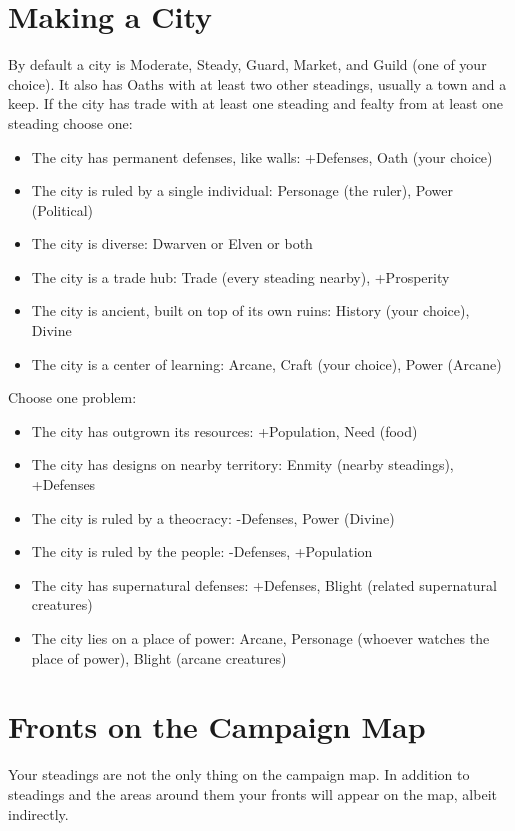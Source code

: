\section*{Making a City}


By default a city is Moderate, Steady, Guard, Market, and Guild (one of your choice). It also has Oaths with at least two other steadings, usually a town and a keep. If the city has trade with at least one steading and fealty from at least one steading choose one:
\begin{itemize}
\item The city has permanent defenses, like walls: +Defenses, Oath (your choice)
\item The city is ruled by a single individual: Personage (the ruler), Power (Political)
\item The city is diverse: Dwarven or Elven or both
\item The city is a trade hub: Trade (every steading nearby), +Prosperity
\item The city is ancient, built on top of its own ruins: History (your choice), Divine
\item The city is a center of learning: Arcane, Craft (your choice), Power (Arcane)

\end{itemize}


Choose one problem:
\begin{itemize}
\item The city has outgrown its resources: +Population, Need (food)
\item The city has designs on nearby territory: Enmity (nearby steadings), +Defenses
\item The city is ruled by a theocracy: -Defenses, Power (Divine)
\item The city is ruled by the people: -Defenses, +Population
\item The city has supernatural defenses: +Defenses, Blight (related supernatural creatures)
\item The city lies on a place of power: Arcane, Personage (whoever watches the place of power), Blight (arcane creatures)

\end{itemize}
\section*{Fronts on the Campaign Map}


Your steadings are not the only thing on the campaign map. In addition to steadings and the areas around them your fronts will appear on the map, albeit indirectly.


